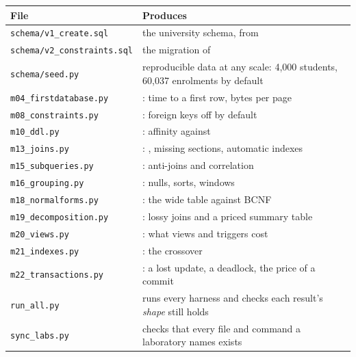 \medskip
\begin{longtable}{@{}L{5.2cm}L{8.8cm}@{}}
\toprule
{}
\textbf{File} & \textbf{Produces} \\
\midrule
\endhead
\texttt{schema/v1\_create.sql} & the university schema, from  \\
\texttt{schema/v2\_constraints.sql} & the migration of  \\
\texttt{schema/seed.py} & reproducible data at any scale: 4{,}000 students,
  60{,}037 enrolments by default \\
\texttt{m04\_firstdatabase.py} & : time to a first row,
  bytes per page \\
\texttt{m08\_constraints.py} & : foreign keys off by default \\
\texttt{m10\_ddl.py} & : affinity against  \\
\texttt{m13\_joins.py} & : , missing sections,
  automatic indexes \\
\texttt{m15\_subqueries.py} & : anti-joins and correlation \\
\texttt{m16\_grouping.py} & : nulls, sorts, windows \\
\texttt{m18\_normalforms.py} & : the wide table against BCNF \\
\texttt{m19\_decomposition.py} & : lossy joins and a
  priced summary table \\
\texttt{m20\_views.py} & : what views and triggers cost \\
\texttt{m21\_indexes.py} & : the crossover \\
\texttt{m22\_transactions.py} & : a lost update, a
  deadlock, the price of a commit \\
\texttt{run\_all.py} & runs every harness and checks each result's
  \emph{shape} still holds \\
\texttt{sync\_labs.py} & checks that every file and command a laboratory names
  exists \\
\bottomrule
\end{longtable}
